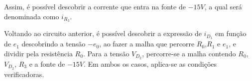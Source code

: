 \documentclass{article}
\numberwithin{equation}{section}
\newlength\Colsep
\let\dfr\dfrac
\begin{document}
\noindent\begin{minipage}{0.95\textwidth}
\begin{minipage}[c][3cm][c]{\dimexpr0.6\textwidth-0.5\Colsep\relax}
    \begin{center}
    \end{center}
\end{minipage} \hfill
\begin{minipage}[c][3cm][c]{\dimexpr0.4\textwidth-0.5\Colsep\relax}
    Assim, é possível descobrir a corrente que entra na fonte de $-15V$, a qual será denominada como $i_{R_3}$.
\end{minipage}
\end{minipage}

\noindent\begin{minipage}{0.95\textwidth}
\begin{minipage}[c][7cm][c]{\dimexpr0.6\textwidth-0.5\Colsep\relax}
    \begin{center}
    \end{center}
\end{minipage} \hfill
\begin{minipage}[c][7cm][c]{\dimexpr0.4\textwidth-0.5\Colsep\relax}
    Voltando ao circuito anterior, é possível descobrir a expressão de $i_{D_1}$ em função de $e_1$ descobrindo a tensão $-e_0$, ao fazer a malha que percorre $R_0$,$R_1$ e $e_1$, e dividir pela resistência $R_0$. Para a tensão $V_{D_2}$, percorre-se a malha contendo $R_0$,$V_{D_2}$, $R_3$ e a fonte de $-15V$. Em ambos os casos, aplica-se as condições verificadoras.
\end{minipage}
\end{minipage}
\end{document}
